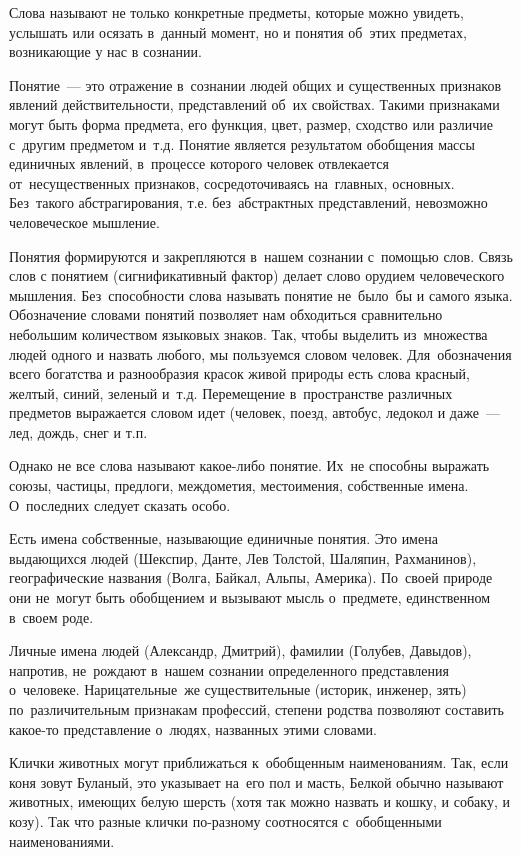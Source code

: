 \documentclass[12pt]{article}
\theoremstyle{definition}
\theoremstyle{remark}
\numberwithin{equation}{section}
\begin{document}
Слова называют не только конкретные предметы, которые можно увидеть,
услышать или осязать в~данный момент, но и понятия об~этих предметах,
возникающие у нас в сознании.

Понятие~--- это отражение в~сознании людей общих и существенных признаков
явлений действительности, представлений об~их свойствах. Такими признаками
могут быть форма предмета, его функция, цвет, размер, сходство или различие
с~другим предметом и~т.д. Понятие является результатом обобщения массы
единичных явлений, в~процессе которого человек отвлекается от~несущественных
признаков, сосредоточиваясь на~главных, основных. Без~такого абстрагирования,
т.е. без~абстрактных представлений, невозможно человеческое мышление.

Понятия формируются и закрепляются в~нашем сознании с~помощью слов.
Связь слов с понятием (сигнификативный фактор) делает слово орудием
человеческого мышления. Без~способности слова называть понятие не~было~бы
и самого языка. Обозначение словами понятий позволяет нам обходиться
сравнительно небольшим количеством языковых знаков. Так, чтобы выделить
из~множества людей одного и назвать любого, мы пользуемся словом человек.
Для~обозначения всего богатства и разнообразия красок живой природы
есть слова красный, желтый, синий, зеленый и~т.д. Перемещение в~пространстве
различных предметов выражается словом идет (человек, поезд, автобус,
ледокол и даже~--- лед, дождь, снег и т.п.

Однако не все слова называют какое-либо понятие. Их~не способны выражать
союзы, частицы, предлоги, междометия, местоимения, собственные имена.
О~последних следует сказать особо.

Есть имена собственные, называющие единичные понятия. Это имена выдающихся
людей (Шекспир, Данте, Лев Толстой, Шаляпин, Рахманинов), географические
названия (Волга, Байкал, Альпы, Америка). По~своей природе они не~могут
быть обобщением и вызывают мысль о~предмете, единственном в~своем роде.

Личные имена людей (Александр, Дмитрий), фамилии (Голубев, Давыдов),
напротив, не~рождают в~нашем сознании определенного представления
о~человеке. Нарицательные~же существительные (историк, инженер, зять)
по~различительным признакам профессий, степени родства позволяют
составить какое-то представление о~людях, названных этими словами.

Клички животных могут приближаться к~обобщенным наименованиям. Так,
если коня зовут Буланый, это указывает на~его пол и масть, Белкой
обычно называют животных, имеющих белую шерсть (хотя так можно назвать
и кошку, и собаку, и козу). Так что разные клички по-разному соотносятся
с~обобщенными наименованиями.
\end{document}
